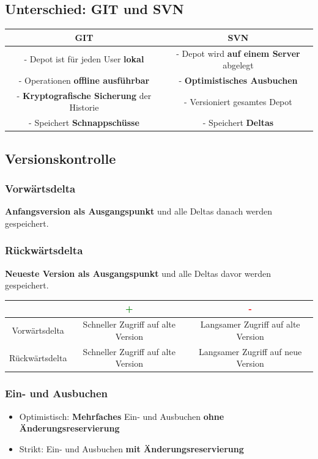 \subsection{Unterschied: GIT und SVN}
	
\begin{center}
\begin{tabular}{c|c}
\textbf{GIT} & \textbf{SVN} \\
\hline
- Depot ist für jeden User \textbf{lokal} & - Depot wird \textbf{auf einem Server} abgelegt \\
- Operationen \textbf{offline ausführbar} & - \textbf{Optimistisches Ausbuchen} \\
- \textbf{Kryptografische Sicherung} der Historie & - Versioniert gesamtes Depot \\
- Speichert \textbf{Schnappschüsse} & - Speichert \textbf{Deltas} \\
\end{tabular}
\end{center}
	
\subsection{Versionskontrolle}
	
\subsubsection{Vorwärtsdelta}

\textbf{Anfangsversion als Ausgangspunkt} und alle Deltas danach werden gespeichert.
	
\subsubsection{Rückwärtsdelta}
	
\textbf{Neueste Version als Ausgangspunkt} und alle Deltas davor werden gespeichert.
	
\begin{tabular}{c|c|c}
& \textcolor{green}{\textbf{+}} & \textcolor{red}{\textbf{-}} \\
\hline
Vorwärtsdelta & Schneller Zugriff auf alte Version & Langsamer Zugriff auf alte Version \\
\hline
Rückwärtsdelta & Schneller Zugriff auf alte Version & Langsamer Zugriff auf neue Version \\
\end{tabular}
	
\subsubsection{Ein- und Ausbuchen}

\begin{itemize}
\item Optimistisch: \textbf{Mehrfaches} Ein- und Ausbuchen \textbf{ohne Änderungsreservierung}
\item Strikt: Ein- und Ausbuchen \textbf{mit Änderungsreservierung}
\end{itemize}